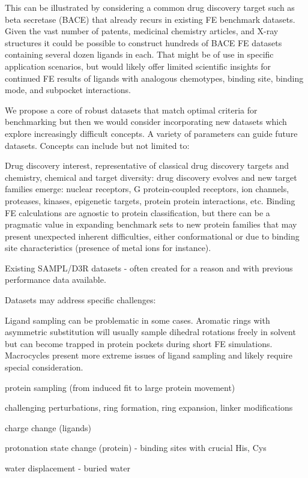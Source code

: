 \documentclass[9pt,bestpractices]{livecoms}
\begin{document}
This can be illustrated by considering a common drug discovery target such as beta secretase (BACE) that already recurs in existing FE benchmark datasets. Given the vast number of patents, medicinal chemistry articles, and X-ray structures it could be possible to construct hundreds of BACE FE datasets containing several dozen ligands in each. That might be of use in specific application scenarios, but would likely offer limited scientific insights for continued FE results of ligands with analogous chemotypes, binding site, binding mode, and subpocket interactions.  

We propose a core of  robust datasets that match optimal criteria for benchmarking but then we would consider incorporating new datasets which explore increasingly difficult concepts. A variety of parameters can guide future datasets. Concepts can include but not limited to:

Drug discovery interest, representative of classical drug discovery targets and chemistry, chemical and target diversity: drug discovery evolves and new target families emerge: nuclear receptors, G protein-coupled receptors, ion channels, proteases, kinases, epigenetic targets, protein protein interactions, etc. Binding FE calculations are agnostic to protein classification, but there can be a pragmatic value in expanding benchmark sets to new protein families that may present unexpected inherent difficulties, either conformational or due to binding site characteristics (presence of metal ions for instance). 

Existing SAMPL/D3R datasets - often created for a reason and with previous performance data available.


Datasets may address specific challenges:

Ligand sampling can be problematic in some cases. Aromatic rings with asymmetric substitution will usually sample dihedral rotations freely in solvent but can become trapped in protein pockets during short FE simulations. Macrocycles present more extreme issues of ligand sampling and likely require special consideration. 

protein sampling (from induced fit to large protein movement)

challenging perturbations, ring formation, ring expansion, linker modifications

charge change (ligands)

protonation state change (protein) - binding sites with crucial His, Cys

water displacement - buried water
\end{document}
